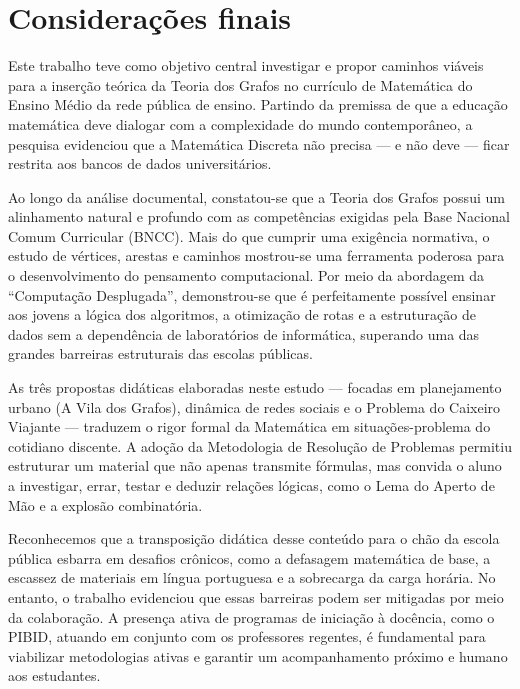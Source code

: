 \documentclass[
  12pt,
  oneside,
  a4paper,
  english,
  brazilian
  ]{abntex2}
\theoremstyle{definition}
\begin{document}
\chapter{Considerações finais}


Este trabalho teve como objetivo central investigar e propor caminhos viáveis para a inserção teórica da Teoria dos Grafos no currículo de Matemática do Ensino Médio da rede pública de ensino. Partindo da premissa de que a educação matemática deve dialogar com a complexidade do mundo contemporâneo, a pesquisa evidenciou que a Matemática Discreta não precisa --- e não deve --- ficar restrita aos bancos de dados universitários.

Ao longo da análise documental, constatou-se que a Teoria dos Grafos possui um alinhamento natural e profundo com as competências exigidas pela Base Nacional Comum Curricular (BNCC). Mais do que cumprir uma exigência normativa, o estudo de vértices, arestas e caminhos mostrou-se uma ferramenta poderosa para o desenvolvimento do pensamento computacional. Por meio da abordagem da ``Computação Desplugada'', demonstrou-se que é perfeitamente possível ensinar aos jovens a lógica dos algoritmos, a otimização de rotas e a estruturação de dados sem a dependência de laboratórios de informática, superando uma das grandes barreiras estruturais das escolas públicas.

As três propostas didáticas elaboradas neste estudo --- focadas em planejamento urbano (A Vila dos Grafos), dinâmica de redes sociais e o Problema do Caixeiro Viajante --- traduzem o rigor formal da Matemática em situações-problema do cotidiano discente. A adoção da Metodologia de Resolução de Problemas permitiu estruturar um material que não apenas transmite fórmulas, mas convida o aluno a investigar, errar, testar e deduzir relações lógicas, como o Lema do Aperto de Mão e a explosão combinatória.

Reconhecemos que a transposição didática desse conteúdo para o chão da escola pública esbarra em desafios crônicos, como a defasagem matemática de base, a escassez de materiais em língua portuguesa e a sobrecarga da carga horária. No entanto, o trabalho evidenciou que essas barreiras podem ser mitigadas por meio da colaboração. A presença ativa de programas de iniciação à docência, como o PIBID, atuando em conjunto com os professores regentes, é fundamental para viabilizar metodologias ativas e garantir um acompanhamento próximo e humano aos estudantes.
\end{document}
